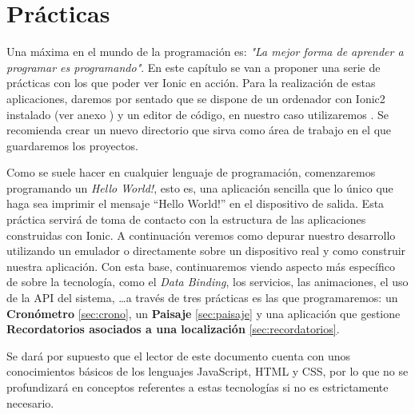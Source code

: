 \clearpage
\chapter{Prácticas} \label{ch:practices}

Una máxima en el mundo de la programación es: \emph{"La mejor forma de aprender a programar es programando"}. En este capítulo se van a proponer una serie de prácticas con los que poder ver Ionic en acción. Para la realización de estas aplicaciones, daremos por sentado que se dispone de un ordenador con Ionic2 instalado (ver anexo ) y un editor de código, en nuestro caso utilizaremos . Se recomienda crear un nuevo directorio que sirva como área de trabajo en el que guardaremos los proyectos.

Como se suele hacer en cualquier lenguaje de programación, comenzaremos programando un \emph{Hello World!}, esto es, una aplicación sencilla que lo único que haga sea imprimir el mensaje ``Hello World!'' en el dispositivo de salida. Esta práctica servirá de toma de contacto con la estructura de las aplicaciones construidas con Ionic. A continuación veremos como depurar nuestro desarrollo utilizando un emulador o directamente sobre un dispositivo real y como construir nuestra aplicación. Con esta base, continuaremos viendo aspecto más específico de sobre la tecnología, como el \emph{Data Binding}, los servicios, las animaciones, el uso de la \gls{API} del sistema, \ldots a través de tres prácticas es las que programaremos: un \textbf{Cronómetro} \ref{sec:crono}, un \textbf{Paisaje} \ref{sec:paisaje} y una aplicación que gestione \textbf{Recordatorios asociados a una localización} \ref{sec:recordatorios}.

Se dará por supuesto que el lector de este documento cuenta con unos conocimientos básicos de los lenguajes JavaScript, \gls{HTML} y \gls{CSS}, por lo que no se profundizará en conceptos referentes a estas tecnologías si no es estrictamente necesario.
